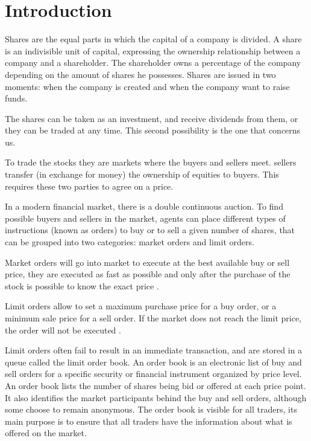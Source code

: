 \section{Introduction}\label{sec:introduction}

Shares are the equal parts in which the capital of a company is divided.
A share is an indivisible unit of capital, expressing the ownership
relationship between a company and a shareholder. The shareholder owns a
percentage of the company depending on the amount of shares he possesses.
Shares are issued in two moments: when the company is created and when the
company want to raise funds.

The shares can be taken as an investment, and receive dividends from them, or
they can be traded at any time.  This second possibility is the one that
concerns us.

To trade the stocks they are markets where the buyers and sellers meet. sellers
transfer (in exchange for money) the ownership of equities to buyers. This
requires these two parties to agree on a price.

In a modern financial market, there is a double continuous auction. To find
possible buyers and sellers in the market, agents can place different types of
instructions (known as orders) to buy or to sell a given number of shares, that
can be grouped into two categories: market orders and limit orders.

Market orders will go into market to execute at the best available buy or sell
price, they are executed as fast as possible and only after the purchase of the
stock is possible to know the exact price \cite{large_prices_changes}.

Limit orders allow to set a maximum purchase price for a buy order, or a
minimum sale price for a sell order. If the market does not reach the limit
price, the order will not be executed \cite{large_prices_changes}.

Limit orders often fail to result in an immediate transaction, and are stored
in a queue called the limit order book. An order book is an electronic list of
buy and sell orders for a specific security or financial instrument organized
by price level. An order book lists the number of shares being bid or offered
at each price point. It also identifies the market participants behind the buy
and sell orders, although some choose to remain anonymous. The order book is
visible for all traders, its main purpose is to ensure that all traders have
the information about what is offered on the market.


